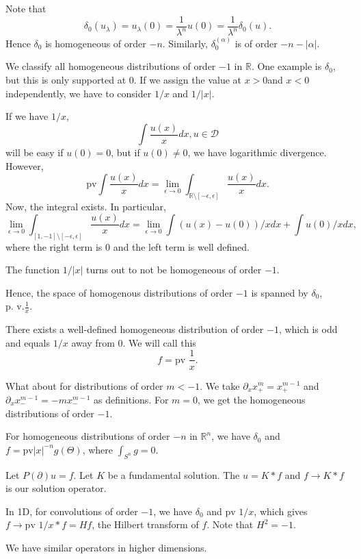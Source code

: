 \documentclass[11pt]{scrartcl}
\newcommand{\R}{\mathbb{R}}
\begin{document}
\begin{example} Note that $$\delta_0(u_\lambda) = u_\lambda(0) = \frac{1}{\lambda^n} u(0) = \frac{1}{\lambda^n} \delta_0(u).$$
Hence $\delta_0$ is homogeneous of order $-n$. Similarly, $\delta_0^(\alpha)$ is of order $-n-|\alpha|$.
\end{example}
\begin{example}
We classify all homogeneous distributions of order $-1$ in $\R$.  One example is $\delta_0$, but this is only supported at $0$.   If we assign the value at $x>0 $and $x < 0$ independently, we have to consider $1/x$ and $1/|x|$.  

If we have $1/x$,
$$\int \frac{u(x)}{x}dx, u \in \mathcal D$$
will be easy if $u(0) = 0$, but if $u(0) \ne 0$, we have logarithmic divergence.  However, 
$$\text{pv}\int \frac{u(x)}{x}dx = \lim_{\epsilon \rightarrow 0} \int_{\R\setminus [-\epsilon, \epsilon]}\frac{u(x)}{x}dx.$$
Now, the integral exists.  In particular,
$$\lim_{\epsilon \rightarrow 0} \int_{[1, -1] \setminus [-\epsilon, \epsilon]} \frac{u(x)}{x}dx = \lim_{\epsilon \rightarrow 0} \int (u(x)-u(0))/xdx + \int u(0)/xdx,$$
where the right term is 0 and the left term is well defined.

The function $1/|x|$ turns out to not be homogeneous of order $-1$.

Hence, the space of homogenous distributions of order $-1$ is spanned by $\delta_0$, $\text{p. v.} \frac{1}{x}.$
\end{example}
\begin{proposition} There exists a well-defined homogeneous distribution of order $-1$, which is odd and equals $1/x$ away from 0.  We will call this 
$$f = \text{pv } \frac{1}{x}.$$
\end{proposition}

What about for distributions of order $m < -1$.  We take $\partial_x x_+^m = x_+^{m-1}$ and $\partial_x x_-^{m-1} = -m x_-^{m-1}$ as definitions.  For $m=0$, we get the homogeneous distributions of order $-1$.  

For homogeneous distributions of order $-n$ in $\R^n$, we have $\delta_0$
 and $f = \text{pv} |x|^{-n}g(\Theta)$, where $\int_{S^n}g = 0$.  
 
\begin{example}
Let $P(\partial) u = f$.  Let $K$ be a fundamental solution.  The $u = K*f$ and $f \to K*f$ is our solution operator.  

In 1D, for convolutions of order $-1$, we have $\delta_0$ and $\text{pv }1/x$, which gives $f \to \text{pv }1/x * f = Hf$, the Hilbert transform of $f$.  Note that $H^2 = -1$.

We have similar operators in higher dimensions. 
\end{example}
\pagebreak
\end{document}
